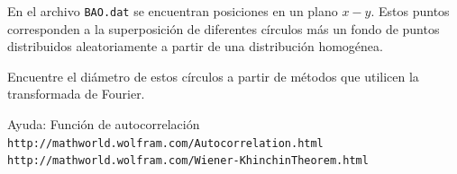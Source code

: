\documentclass[11pt,letterpaper]{exam}
\begin{document}
\begin{questions}

En el archivo \verb"BAO.dat" se encuentran posiciones en un plano
$x-y$. Estos puntos corresponden a la superposici\'on de diferentes
c\'irculos m\'as un fondo de puntos distribuidos aleatoriamente a
partir de una distribuci\'on homog\'enea. 

Encuentre el di\'ametro de estos c\'irculos a partir de m\'etodos que
utilicen la transformada de Fourier. 

Ayuda:
Funci\'on de autocorrelaci\'on \\ 
\verb"http://mathworld.wolfram.com/Autocorrelation.html"\\
\verb"http://mathworld.wolfram.com/Wiener-KhinchinTheorem.html"

\end{questions}
\end{document}
